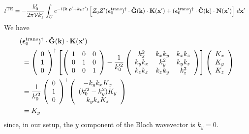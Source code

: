\documentclass[letterpaper]{article}
\newcommand{\vbEps}{\boldsymbol{\epsilon}}
\begin{document}
\begin{align*}
 t\sups{TE}
&=-\frac{k_0^\prime}{2\pi \mc V k_z^\prime}
   \int_U e^{-i(\vb k \cdot \vbrho^\prime + k_z z^\prime)}
        \left[ Z_0 Z^\prime 
               (\vbEps_0\sups{trans})^\dagger \cdot 
               \vbhat{G}(\vb k) \cdot \vb K(\vb x^\prime)
               +(\vbEps_0\sups{trans})^\dagger \cdot 
               \vbhat{C}(\vb k)\cdot \vb N(\vb x^\prime) 
        \right] \, d\vb x^\prime
\end{align*}
We have 
\begin{align*}
&\hspace{-0.05in}
 (\vbEps_0\sups{trans})^\dagger \cdot
 \vbhat{G}(\vb k) \cdot \vb K(\vb x^\prime)
\\
&=
 \left(\begin{array}{c}0 \\ 1 \\ 0\end{array}\right)^\dagger
 \left[ \left(\begin{array}{ccc}
               1 & 0 & 0 \\ 
               0 & 1 & 0 \\ 
               0 & 0 & 1
              \end{array}\right)
       -\frac{1}{k_0^{\prime 2}}
        \left(\begin{array}{ccc}
               k_x^2   & k_x k_y & k_x k_z \\
               k_yk_x  & k_y^2   & k_y k_z \\
               k_z k_x & k_z k_y & k_z^2
              \end{array}
        \right)
 \right]
 \left(\begin{array}{c}K_x \\ K_y \\ K_z\end{array}\right)
\\
&=
 \frac{1}{k_0^{\prime 2}}
 \left(\begin{array}{c}0 \\ 1 \\ 0\end{array}\right)^\dagger
 \left(\begin{array}{c} -k_y k_x K_x \\ (k_0^{\prime 2}-k_y^2)K_y \\ k_y k_z K_z
       \end{array}\right)
\\
&= K_y
\end{align*}
since, in our setup, the $y$ component of the Bloch 
wavevector is $k_y=0.$
\end{document}
